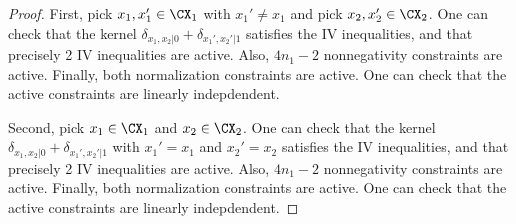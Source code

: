 \begin{proof}
  First, pick $x_1,x_1' \in \CX_1$ with $x_1' \ne x_1$ and pick $x_2,x_2' \in \CX_2$.
  One can check that the kernel $\delta_{x_1,x_2|0} + \delta_{x_1',x_2'|1}$ satisfies the IV inequalities, and that precisely 2 IV inequalities are active.
  Also, $4n_1 - 2$ nonnegativity constraints are active.
  Finally, both normalization constraints are active.
  One can check that the active constraints are linearly indepdendent.

  Second, pick $x_1 \in \CX_1$ and $x_2 \in \CX_2$. One can check that the kernel $\delta_{x_1,x_2|0} + \delta_{x_1',x_2'|1}$ with $x_1'=x_1$ and $x_2'=x_2$ satisfies the IV inequalities, and that precisely 2 IV inequalities are active.
  Also, $4n_1 - 2$ nonnegativity constraints are active.
  Finally, both normalization constraints are active.
  One can check that the active constraints are linearly indepdendent.


\end{proof}
